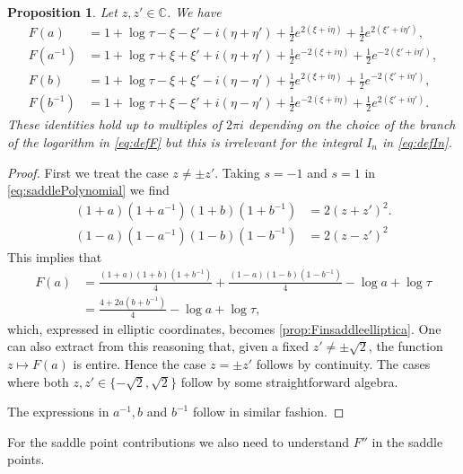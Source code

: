 \documentclass[%
 jmp,
cp,  %
 amsmath,amsthm,amssymb,%
 reprint,%
onecolumn]{revtex4-2}
\newtheorem{proposition}[theorem]{Proposition}
\begin{document}
\begin{proposition} \label{prop:Finsaddleelliptic}
Let $z, z'\in \mathbb C$. We have
\begin{align} \label{prop:Finsaddleelliptica}
F(a) &= 1 + \log \tau - \xi - \xi' - i(\eta+\eta') +  \frac{1}{2} e^{2 (\xi + i \eta)} + \frac{1}{2} e^{2 (\xi'+ i \eta')},\\ \label{prop:Finsaddleelliptica-}
F(a^{-1}) &= 1 + \log \tau + \xi + \xi' + i(\eta+\eta') +  \frac{1}{2} e^{-2 (\xi + i \eta)} + \frac{1}{2} e^{-2 (\xi'+ i \eta')},\\
F(b) &= 1 + \log \tau - \xi + \xi' - i(\eta-\eta') +  \frac{1}{2} e^{2 (\xi + i \eta)} + \frac{1}{2} e^{-2 (\xi'+ i \eta')},\\
F(b^{-1}) &= 1 + \log \tau + \xi - \xi' + i(\eta-\eta') +  \frac{1}{2} e^{-2 (\xi + i \eta)} + \frac{1}{2} e^{2 (\xi'+ i \eta')}.
\end{align}
These identities hold up to multiples of $2\pi i$ depending on the choice of the branch of the logarithm in \eqref{eq:defF} but this is irrelevant for the integral $I_n$ in \eqref{eq:defIn}.
\end{proposition}
\begin{proof}
First we treat the case $z\neq \pm z'$. Taking $s=-1$ and $s=1$ in \eqref{eq:saddlePolynomial} we find
\begin{align} \label{eq:aa-bb-1}
(1+a) (1+a^{-1}) (1+b) (1+b^{-1}) &= 2 (z+z')^2.\\ \label{eq:aa-bb-2}
(1-a) (1-a^{-1}) (1-b) (1-b^{-1}) &= 2 (z-z')^2
\end{align}
This implies that
\begin{align*}
F(a) &= \frac{(1+a)(1+b)(1+b^{-1})}{4} + \frac{(1-a)(1-b)(1-b^{-1})}{4} - \log a + \log \tau\\
&= \frac{4 + 2a(b+b^{-1})}{4} - \log a + \log \tau,
\end{align*}
which, expressed in elliptic coordinates, becomes \eqref{prop:Finsaddleelliptica}. One can also extract from this reasoning that, given a fixed $z' \neq \pm \sqrt 2$, the function $z\mapsto F(a)$ is entire. Hence the case $z=\pm z'$ follows by continuity. The cases where both $z, z'\in \{-\sqrt 2, \sqrt 2\}$ follow by some straightforward algebra. 

The expressions in $a^{-1}, b$ and $b^{-1}$ follow in similar fashion. 
\end{proof}

For the saddle point contributions we also need to understand $F''$ in the saddle points. 
\end{document}
